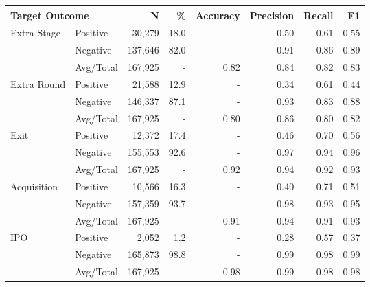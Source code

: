 \begin{tabular}{llrrrrrr} \toprule
\multicolumn{2}{l}{Target Outcome} & N       & \%   & Accuracy  & Precision  & Recall  & F1   \\ \midrule
Extra Stage & Positive & 30,279  & 18.0 & -    & 0.50 & 0.61 & 0.55 \\
            & Negative & 137,646 & 82.0 & -    & 0.91 & 0.86 & 0.89 \\
            & Avg/Total & 167,925 & -    & 0.82 & 0.84 & 0.82 & 0.83 \\ \midrule
Extra Round & Positive & 21,588  & 12.9 & -    & 0.34 & 0.61 & 0.44 \\
            & Negative & 146,337 & 87.1 & -    & 0.93 & 0.83 & 0.88 \\
            & Avg/Total & 167,925 & -    & 0.80 & 0.86 & 0.80 & 0.82 \\ \midrule
Exit        & Positive & 12,372  & 17.4 & -    & 0.46 & 0.70 & 0.56 \\
            & Negative & 155,553 & 92.6 & -    & 0.97 & 0.94 & 0.96 \\
            & Avg/Total & 167,925 & -    & 0.92 & 0.94 & 0.92 & 0.93 \\ \midrule
Acquisition & Positive & 10,566  & 16.3 & -    & 0.40 & 0.71 & 0.51 \\
            & Negative & 157,359 & 93.7 & -    & 0.98 & 0.93 & 0.95 \\
            & Avg/Total & 167,925 & -    & 0.91 & 0.94 & 0.91 & 0.93 \\ \midrule
IPO         & Positive & 2,052   & 1.2  & -    & 0.28 & 0.57 & 0.37 \\
            & Negative & 165,873 & 98.8 & -    & 0.99 & 0.98 & 0.99 \\
            & Avg/Total & 167,925 & -    & 0.98 & 0.99 & 0.98 & 0.98 \\
\bottomrule \end{tabular}

